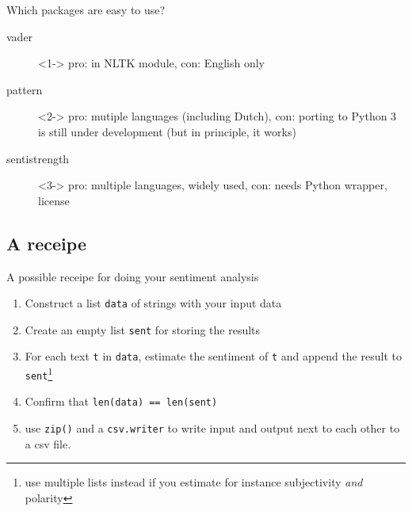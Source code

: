 \documentclass{beamer}
\begin{document}
\begin{frame}{Which packages are easy to use?}
	
\begin{description}
	\item[vader]<1-> pro: in NLTK module, con: English only
	\item[pattern]<2-> pro: mutiple languages (including Dutch), con: porting to Python 3 is still under development (but in principle, it works)
	\item[sentistrength]<3-> pro: multiple languages, widely used, con: needs Python wrapper, license
	
\end{description}




\end{frame}



\subsection{A receipe}

\begin{frame}{A possible receipe for doing your sentiment analysis}
	
\begin{enumerate}
	\item Construct a list \texttt{data} of strings with your input data
	\item Create an empty list \texttt{sent} for storing the results
	\item For each text \texttt{t} in \texttt{data}, estimate the sentiment of \texttt{t} and append the result to \texttt{sent}\footnote{use multiple lists instead if you estimate for instance subjectivity \emph{and} polarity}
	\item Confirm that \texttt{len(data) == len(sent)}
	\item use \texttt{zip()} and a  \texttt{csv.writer} to write input and output next to each other to a csv file.
\end{enumerate}

\end{frame}
\end{document}
